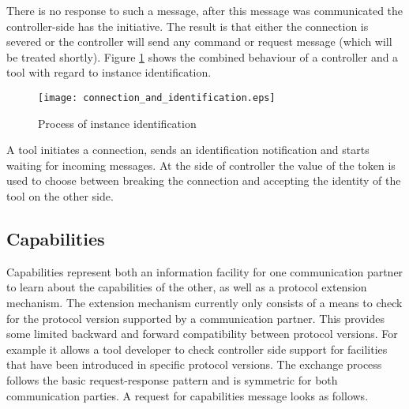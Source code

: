 \documentclass{article}
\begin{document}
   \noindent There is no response to such a message, after this message was
   communicated the controller-side has the initiative. The result is that
   either the connection is severed or the controller will send any command or
   request message (which will be treated shortly). Figure
   \ref{fig::identification} shows the combined behaviour of a controller and a
   tool with regard to instance identification.

   \begin{figure}[H]
    \vspace{-0.2cm}
    \begin{center}
     \texttt{[image: connection\_and\_identification.eps]}
    \end{center}
    \vspace{-0.5cm}
    \caption{Process of instance identification}
    \label{fig::identification}
   \end{figure}

   \noindent A tool initiates a connection, sends an identification
   notification and starts waiting for incoming messages.  At the side of
   controller the value of the token is used to choose between breaking the
   connection and accepting the identity of the tool on the other side.

  \subsection{Capabilities} \label{ss:capabilities}

   Capabilities represent both an information facility for one communication
   partner to learn about the capabilities of the other, as well as a protocol
   extension mechanism. The extension mechanism currently only consists of a
   means to check for the protocol version supported by a communication
   partner. This provides some limited backward and forward compatibility
   between protocol versions.  For example it allows a tool developer to check
   controller side support for facilities that have been introduced in specific
   protocol versions. The exchange process follows the basic request-response
   pattern and is symmetric for both communication parties. A request for
   capabilities message looks as follows.
   
\end{document}
